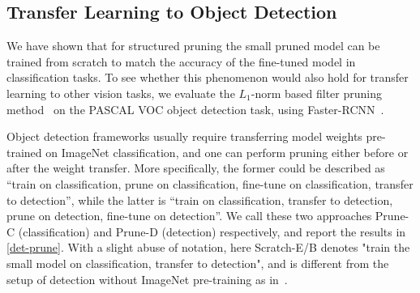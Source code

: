 \subsection{Transfer Learning to Object Detection}
\label{sec:transfer}

We have shown that for structured pruning the small pruned model can be trained from scratch to match the accuracy of the fine-tuned model in classification tasks. To see whether this phenomenon would also hold for transfer learning to other vision tasks, we evaluate the $L_1$-norm based filter pruning method~\cite{li2016pruning} on the PASCAL VOC object detection task, using Faster-RCNN~\cite{Ren2015}. 

Object detection frameworks usually require transferring model weights pre-trained on ImageNet classification, and one can perform pruning either before or after the weight transfer. More specifically, the former could be described as ``train on classification, prune on classification, fine-tune on classification, transfer to detection'', while the latter is ``train on classification, transfer to detection, prune on detection, fine-tune on detection''. We call these two approaches Prune-C (classification) and Prune-D (detection) respectively, and report the results in \autoref{det-prune}. With a slight abuse of notation, here Scratch-E/B denotes "train the small model on classification, transfer to detection", and is different from the setup of detection without ImageNet pre-training as in~\cite{dsod}.

\begin{table}[ht]
\begin{minipage}{\linewidth}
\centering
\small
\label{det-prune}
\end{minipage}\hfill
\end{table}

